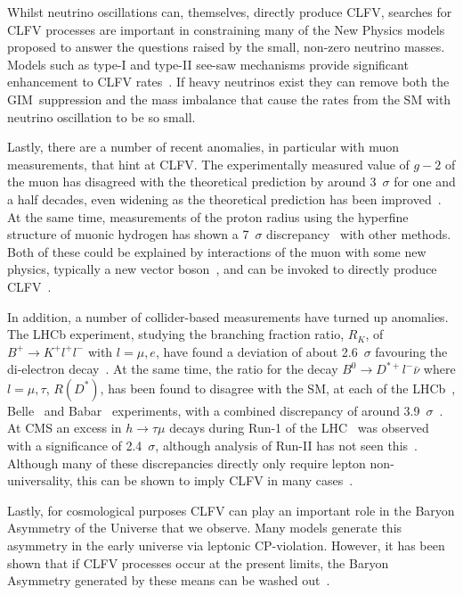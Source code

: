 Whilst neutrino oscillations can, themselves, directly produce \ac{CLFV}, searches for CLFV processes are important in constraining many of the New Physics models proposed to answer the questions raised by the small, non-zero neutrino masses.
Models such as type-I and type-II see-saw mechanisms provide significant enhancement to \ac{CLFV} rates~\cite{Dinh:2012bp}.
If heavy neutrinos exist they can remove both the GIM~suppression and the mass imbalance that cause the rates from the \ac{SM} with neutrino oscillation to be so small.

Lastly, there are a number of recent anomalies, in particular with muon measurements, that hint at \ac{CLFV}.
The experimentally measured value of $g-2$ of the muon has disagreed with the theoretical prediction by around 3~$\sigma$ for one and a half decades, even widening as the theoretical prediction has been improved~\cite{Blum:2013xva,Brown:2001mga}.
At the same time, measurements of the proton radius using the hyperfine structure of muonic hydrogen has shown a 7~$\sigma$ discrepancy~\cite{Antognini:1900ns} with other methods.
Both of these could be explained by interactions of the muon with some new physics, typically a new vector boson~\cite{Martens:2016zzx,Karshenboim:2014tka}, and can be invoked to directly produce CLFV~\cite{Heeck:2016xkh}.

In addition, a number of collider-based measurements have turned up anomalies.
The LHCb experiment, studying the branching fraction ratio, $R_K$, of $B^+\rightarrow{}K^+l^+l^-$ with $l=\mu,e$, have found a deviation of about 2.6~$\sigma$ favouring the di-electron decay~\cite{Aaij:2014ora}.
At the same time,  the ratio for the decay $B^0\rightarrow D^{*+}l^-\bar{\nu}$ where $l=\mu,\tau$, $R(D^*)$, has been found to disagree with the SM, at each of the LHCb~\cite{Aaij:2015yra}, Belle~\cite{Abdesselam:2016cgx} and Babar~\cite{Lees:2012xj} experiments, with a combined discrepancy of around 3.9~$\sigma$~\cite{Lafferty:2016ckl}.
At CMS an excess in $h\rightarrow\tau\mu$ decays during Run-1 of the LHC~\cite{Khachatryan:2015kon} was observed with a significance of 2.4~$\sigma$, although analysis of Run-II has not seen this~\cite{CMS:2016qvi}.
Although many of these discrepancies directly only require lepton non-universality, this can be shown to imply \ac{CLFV} in many cases~\cite{Glashow:2014iga}.

Lastly, for cosmological purposes \ac{CLFV} can play an important role in the Baryon Asymmetry of the Universe that we observe.
Many models generate this asymmetry in the early universe via leptonic CP-violation.
However, it has been shown that if \ac{CLFV} processes occur at the present limits, the Baryon Asymmetry generated by these means can be washed out~\cite{Deppisch:2015yqa}.

